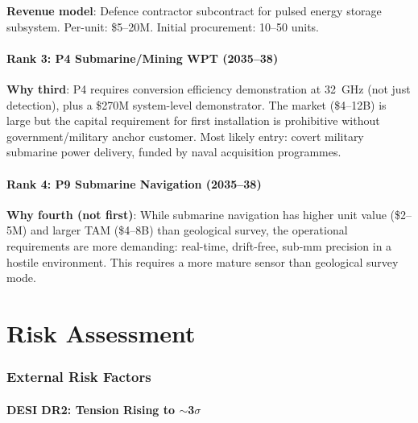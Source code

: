 \documentclass[11pt]{article}
\begin{document}
\textbf{Revenue model}: Defence contractor subcontract for pulsed energy
storage subsystem. Per-unit: \$5--20M. Initial procurement: 10--50 units.

\subsection{Rank 3: P4 Submarine/Mining WPT (2035--38)}

\textbf{Why third}: P4 requires conversion efficiency demonstration at
32~GHz (not just detection), plus a \$270M system-level demonstrator.
The market (\$4--12B) is large but the capital requirement for first
installation is prohibitive without government/military anchor customer.
Most likely entry: covert military submarine power delivery, funded by
naval acquisition programmes.

\subsection{Rank 4: P9 Submarine Navigation (2035--38)}

\textbf{Why fourth (not first)}: While submarine navigation has higher
unit value (\$2--5M) and larger TAM (\$4--8B) than geological survey,
the operational requirements are more demanding: real-time, drift-free,
sub-mm precision in a hostile environment. This requires a more mature
sensor than geological survey mode.

\part{Risk Assessment}
\label{part:risk}

\section{External Risk Factors}
\label{sec:external-risk}

\subsection{DESI DR2: Tension Rising to $\sim$3$\sigma$}
\end{document}
